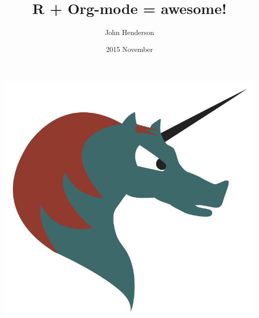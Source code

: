 \documentclass[aspectratio=169,presentation,bigger,fleqn,t]{beamer}
\author{John Henderson}
\date{2015 November}
\title{R + Org-mode = awesome!}
\begin{document}
\maketitle

\begin{frame}[label={sec:orgheadline1}]{}
\begin{center}
\includegraphics[width=\textwidth]{./img/org-mode.png}
\end{center}
\end{frame}
\end{document}
